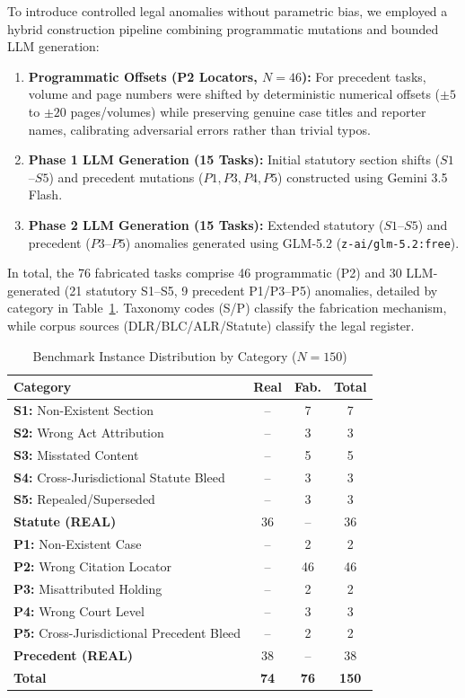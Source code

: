 \documentclass[conference]{IEEEtran}
\begin{document}
To introduce controlled legal anomalies without parametric bias, we employed a hybrid construction pipeline combining programmatic mutations and bounded LLM generation:
\begin{enumerate}
\item \textbf{Programmatic Offsets (P2 Locators, $N=46$):} For precedent tasks, volume and page numbers were shifted by deterministic numerical offsets ($\pm 5$ to $\pm 20$ pages/volumes) while preserving genuine case titles and reporter names, calibrating adversarial errors rather than trivial typos.
\item \textbf{Phase 1 LLM Generation (15 Tasks):} Initial statutory section shifts ($S1$--$S5$) and precedent mutations ($P1, P3, P4, P5$) constructed using Gemini 3.5 Flash.
\item \textbf{Phase 2 LLM Generation (15 Tasks):} Extended statutory ($S1$--$S5$) and precedent ($P3$--$P5$) anomalies generated using GLM-5.2 (\texttt{z-ai/glm-5.2:free}).
\end{enumerate}

In total, the 76 fabricated tasks comprise 46 programmatic (P2) and 30 LLM-generated (21 statutory S1--S5, 9 precedent P1/P3--P5) anomalies, detailed by category in Table~\ref{tab:dataset_distribution}. Taxonomy codes (S/P) classify the fabrication mechanism, while corpus sources (DLR/BLC/ALR/Statute) classify the legal register.

\begin{table}[!t]
\caption{Benchmark Instance Distribution by Category ($N=150$)}
\label{tab:dataset_distribution}
\centering
\scriptsize
\setlength{\tabcolsep}{3pt}
\begin{tabular}{p{}ccc}
\toprule
\textbf{Category} & \textbf{Real} & \textbf{Fab.} & \textbf{Total} \\
\midrule
\textbf{S1:} Non-Existent Section & -- & 7 & 7 \\
\textbf{S2:} Wrong Act Attribution & -- & 3 & 3 \\
\textbf{S3:} Misstated Content & -- & 5 & 5 \\
\textbf{S4:} Cross-Jurisdictional Statute Bleed & -- & 3 & 3 \\
\textbf{S5:} Repealed/Superseded & -- & 3 & 3 \\
\textbf{Statute (REAL)} & 36 & -- & 36 \\
\midrule
\textbf{P1:} Non-Existent Case & -- & 2 & 2 \\
\textbf{P2:} Wrong Citation Locator & -- & 46 & 46 \\
\textbf{P3:} Misattributed Holding & -- & 2 & 2 \\
\textbf{P4:} Wrong Court Level & -- & 3 & 3 \\
\textbf{P5:} Cross-Jurisdictional Precedent Bleed & -- & 2 & 2 \\
\textbf{Precedent (REAL)} & 38 & -- & 38 \\
\midrule
\textbf{Total} & \textbf{74} & \textbf{76} & \textbf{150} \\
\bottomrule
\end{tabular}
\end{table}
\end{document}
